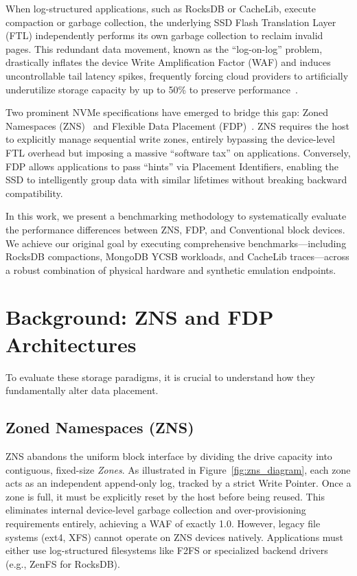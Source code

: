 \documentclass[letterpaper,twocolumn,10pt]{article}
\begin{document}
When log-structured applications, such as RocksDB or CacheLib, execute compaction or garbage collection, the underlying SSD Flash Translation Layer (FTL) independently performs its own garbage collection to reclaim invalid pages. This redundant data movement, known as the ``log-on-log'' problem, drastically inflates the device Write Amplification Factor (WAF) and induces uncontrollable tail latency spikes, frequently forcing cloud providers to artificially underutilize storage capacity by up to 50\% to preserve performance~\cite{berg2020cachelib}.

Two prominent NVMe specifications have emerged to bridge this gap: Zoned Namespaces (ZNS)~\cite{bjorling2021zns} and Flexible Data Placement (FDP)~\cite{purandare2025valet}. ZNS requires the host to explicitly manage sequential write zones, entirely bypassing the device-level FTL overhead but imposing a massive ``software tax'' on applications. Conversely, FDP allows applications to pass ``hints'' via Placement Identifiers, enabling the SSD to intelligently group data with similar lifetimes without breaking backward compatibility.

In this work, we present a benchmarking methodology to systematically evaluate the performance differences between ZNS, FDP, and Conventional block devices. We achieve our original goal by executing comprehensive benchmarks—including RocksDB compactions, MongoDB YCSB workloads, and CacheLib traces—across a robust combination of physical hardware and synthetic emulation endpoints.

\section{Background: ZNS and FDP Architectures}

To evaluate these storage paradigms, it is crucial to understand how they fundamentally alter data placement.

\subsection{Zoned Namespaces (ZNS)}
ZNS abandons the uniform block interface by dividing the drive capacity into contiguous, fixed-size \textit{Zones}. As illustrated in Figure~\ref{fig:zns_diagram}, each zone acts as an independent append-only log, tracked by a strict Write Pointer. Once a zone is full, it must be explicitly reset by the host before being reused. This eliminates internal device-level garbage collection and over-provisioning requirements entirely, achieving a WAF of exactly 1.0. However, legacy file systems (ext4, XFS) cannot operate on ZNS devices natively. Applications must either use log-structured filesystems like F2FS or specialized backend drivers (e.g., ZenFS for RocksDB).
\end{document}
